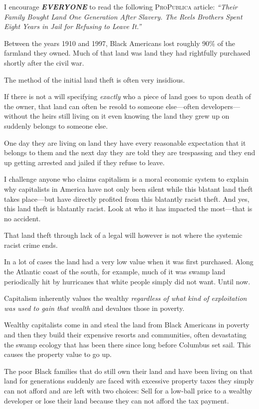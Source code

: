 I encourage \textbf{\emph{EVERYONE}} to read the following \textsc{ProPublica} article: \textit{``Their Family Bought Land One Generation After Slavery. The Reels Brothers Spent Eight Years in Jail for Refusing to Leave It.''}

\bigskip

Between the years 1910 and 1997, Black Americans lost roughly 90\% of the farmland they owned. Much of that land was land they had rightfully purchased shortly after the civil war.

The method of the initial land theft is often very insidious.

If there is not a will specifying \emph{exactly} who a piece of land goes to upon death of the owner, that land can often be resold to someone else---often developers---without the heirs still living on it even knowing the land they grew up on suddenly belongs to someone else.

One day they are living on land they have every reasonable expectation that it belongs to them and the next day they are told they are trespassing and they end up getting arrested and jailed if they refuse to leave.

I challenge anyone who claims capitalism is a moral economic system to explain why capitalists in America have not only been silent while this blatant land theft takes place---but have directly profited from this blatantly racist theft. And yes, this land theft is blatantly racist. Look at who it has impacted the most---that is no accident.

That land theft through lack of a legal will however is not where the systemic racist crime ends.

In a lot of cases the land had a very low value when it was first purchased. Along the Atlantic coast of the south, for example, much of it was swamp land periodically hit by hurricanes that white people simply did not want. Until now.

Capitalism inherently values the wealthy \emph{regardless of what kind of exploitation was used to gain that wealth} and devalues those in poverty.

Wealthy capitalists come in and steal the land from Black Americans in poverty and then they build their expensive resorts and communities, often devastating the swamp ecology that has been there since long before Columbus set sail. This causes the property value to go up.

The poor Black families that do still own their land and have been living on that land for generations suddenly are faced with excessive property taxes they simply can not afford and are left with two choices: Sell for a low-ball price to a wealthy developer or lose their land because they can not afford the tax payment.

